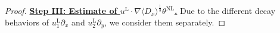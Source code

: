\documentclass[reqno, 12pt]{amsart} %
\theoremstyle{plain} %
\theoremstyle{definition}
\theoremstyle{remark}
\numberwithin{equation}{section} %
\newcommand{\px}{\partial_x}
\newcommand{\py}{\partial_y}
\begin{document}
\begin{proof}
		
		\underline{\bf Step III: Estimate of $  u^{\mathrm{L}} \cdot  \nabla \langle D_x \rangle^\frac13 \theta^{\mathrm{NL}}$.} Due to the different decay behaviors of $u_1^{\mathrm{L}} \px    $ and $u_2^{\mathrm{L}} \py   $, we consider them separately.
		

\end{proof}
\end{document}
